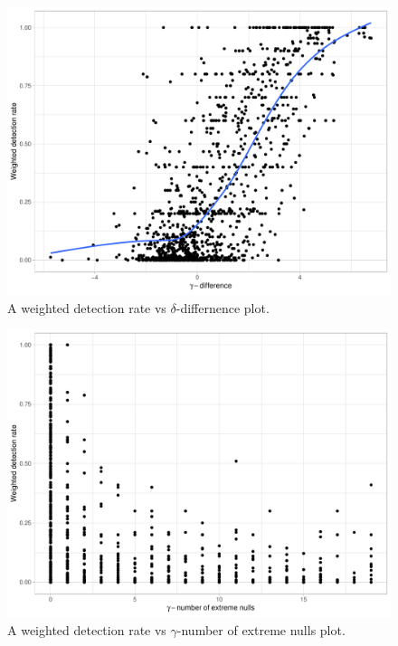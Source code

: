 \documentclass[]{interact}
\theoremstyle{plain}%
\theoremstyle{definition}
\theoremstyle{remark}
\begin{document}
\begin{figure}

{\centering \includegraphics[width=1\linewidth]{paper_files/figure-latex/unnamed-chunk-3-1} 

}

\caption{A weighted detection rate vs $\delta$-differnence plot.}\label{fig:unnamed-chunk-3}
\end{figure}

\begin{figure}

{\centering \includegraphics[width=1\linewidth]{paper_files/figure-latex/unnamed-chunk-4-1} 

}

\caption{A weighted detection rate vs $\gamma$-number of extreme nulls plot.}\label{fig:unnamed-chunk-4}
\end{figure}
\end{document}
